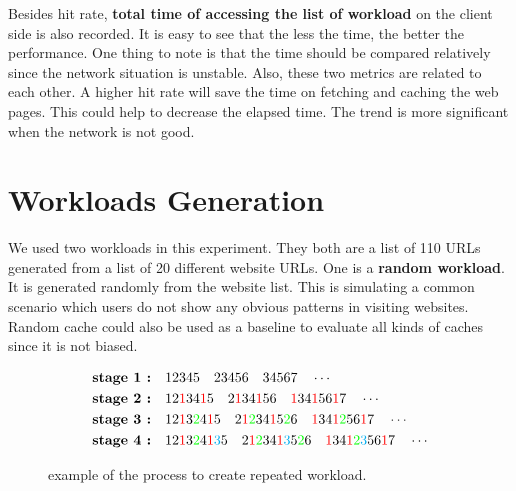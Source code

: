\documentclass[paper=a4, fontsize=11pt]{scrartcl} %
\numberwithin{equation}{section} %
\numberwithin{figure}{section} %
\numberwithin{table}{section} %
\begin{document}
\vspace{1em}

Besides hit rate, \textbf{total time of accessing the list of workload}
on the client side is also recorded. It is easy to see that the less the time, the better the performance. One thing to note is that the time should be compared relatively since the network situation is unstable.
Also, these two metrics are related to each other. A higher hit rate will save the time on fetching and caching the web pages. This could help to decrease the elapsed time. The trend is more significant when the network is not good. 

\section{Workloads Generation}

We used two workloads in this experiment. They both are a list of 110 URLs generated from a list of 20 different website URLs. One is a 
\textbf{random workload}. It is generated randomly from the website list. This is simulating a common scenario which users do not show any obvious patterns in visiting websites. Random cache could also be used as a baseline to evaluate all kinds of caches since it is not biased. 

\vspace{1em}
\begin{figure}[h]
  \centering
  \begin{align*}
    \textbf{stage 1 :} \quad & 
    1 2 3 4 5 \quad 2 3 4 5 6 \quad 3 4 5 6 7 \quad \cdots \\
    \textbf{stage 2 :} \quad & 
    1 2 {\color{red} 1}34{\color{red} 1}5 \quad 
    2 {\color{red} 1}3 4 {\color{red} 1}5 6 \quad 
    {\color{red} 1} 3 4 {\color{red} 1}5 6 {\color{red} 1}7 \quad \cdots \\
    \textbf{stage 3 :} \quad & 
    1 2 {\color{red} 1}3{\color{green} 2}4{\color{red} 1}5 \quad 
    2 {\color{red} 1} {\color{green} 2}3 4 {\color{red} 1}5 
    {\color{green} 2}6 \quad 
    {\color{red} 1} 3 4 {\color{red} 1}{\color{green} 2}5 6 {\color{red} 1}7 \quad \cdots \\
    \textbf{stage 4 :} \quad &
    1 2 {\color{red} 1}3{\color{green} 2}4{\color{red} 1}
    {\color{cyan} 3}5 \quad 
    2 {\color{red} 1} {\color{green} 2}3 4 {\color{red} 1}{\color{cyan} 3}5 
    {\color{green} 2}6 \quad 
    {\color{red} 1} 3 4 {\color{red} 1}{\color{green} 2}{\color{cyan} 3}5 6 {\color{red} 1}7 \quad \cdots
  \end{align*}
  \caption{example of the process to create repeated workload.}
  \label{fig:wl}
\end{figure}
\end{document}
